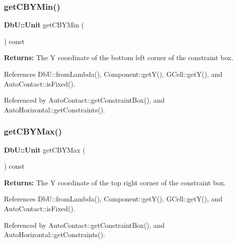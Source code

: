 \subsubsection{\texorpdfstring{get\+C\+B\+Y\+Min()}{getCBYMin()}}
{\footnotesize\ttfamily \textbf{ Db\+U\+::\+Unit} get\+C\+B\+Y\+Min (\begin{DoxyParamCaption}{ }\end{DoxyParamCaption}) const\hspace{0.3cm}{\ttfamily [inline]}}

{\bfseries Returns\+:} The Y coordinate of the bottom left corner of the constraint box. 

References Db\+U\+::from\+Lambda(), Component\+::get\+Y(), G\+Cell\+::get\+Y(), and Auto\+Contact\+::is\+Fixed().



Referenced by Auto\+Contact\+::get\+Constraint\+Box(), and Auto\+Horizontal\+::get\+Constraints().

\mbox{\label{classKatabatic_1_1AutoContact_a4e4061a17285b0c08c31cfee65947cb6}} 
\subsubsection{\texorpdfstring{get\+C\+B\+Y\+Max()}{getCBYMax()}}
{\footnotesize\ttfamily \textbf{ Db\+U\+::\+Unit} get\+C\+B\+Y\+Max (\begin{DoxyParamCaption}{ }\end{DoxyParamCaption}) const\hspace{0.3cm}{\ttfamily [inline]}}

{\bfseries Returns\+:} The Y coordinate of the top right corner of the constraint box. 

References Db\+U\+::from\+Lambda(), Component\+::get\+Y(), G\+Cell\+::get\+Y(), and Auto\+Contact\+::is\+Fixed().



Referenced by Auto\+Contact\+::get\+Constraint\+Box(), and Auto\+Horizontal\+::get\+Constraints().

\mbox{\label{classKatabatic_1_1AutoContact_ae9d087a6cd3d459d7f4bea6bc8b08b49}} 
